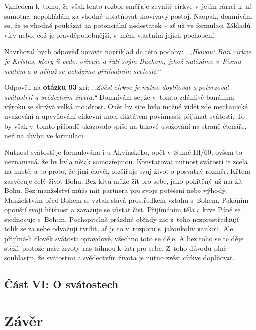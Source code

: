 Vzhledem k~tomu, že však tento rozbor směřuje zevnitř církve v~jejím rámci k~ní
samotné, nepokládám za vhodné uplatňovat shovívavý postoj. Naopak, domnívám se,
že je vhodné poukázat na potenciální nedostatek -- ať už ve formulaci Základů
víry nebo, což je pravděpodobnější, v~mém vlastním jejich pochopení.

Navrhoval bych odpověď upravit například do této podoby: \textit{,,,Hlavou` Boží
církve je Kristus, který ji vede, oživuje a řídí svým Duchem, jehož nalézáme
v~Písmu svatém a o něhož se ucházíme přijímáním svátostí.``}

Odpověď na \textbf{otázku 93} zní: \textit{,,Zvěst církve je nutno doplňovat a potvrzovat
svátostmi a svědectvím života.``} Domnívám se, že v~tomto zdánlivě banálním
výroku se skrývá velká moudrost. Opět by sice bylo možné vidět zde mechanické
uvažování a upevňování církevní moci diktátem povinnosti přijímat svátosti. To
by však v~tomto případě ukazovalo spíše na takové uvažování na straně čtenáře,
než na chybu ve formulaci.

Nutnost svátostí je formulována i u Akvinského, opět v~Sumě III/60, ovšem to
neznamená, že by byla nějak samozřejmou. Konstatovat nutnost svátostí je zcela
na místě, a to proto, že jimi člověk rozšiřuje svůj život o posvátný rozměr.
Křtem zasvěcuje celý život Bohu. Bez křtu může žít pro sebe, jako pokřtěný už má
žít Bohu. Bez manželství může mít partnera pro svoje potěšení nebo výhody.
Manželstvím před Bohem se vztah stává prostředkem vztahu s~Bohem. Pokáním
opouští svoji hříšnost a zavazuje se zůstat čist. Přijímáním těla a krve Páně se
sjednocuje s~Bohem. Pochopitelně prázdné obřady nic z~toho nezprostředkují --
tolik se za sebe odvažuji tvrdit, ať je to v~rozporu s~jakoukoliv naukou. Ale
přijímá-li člověk svátosti opravdově, všechno toto se děje. A bez toho se to
děje stěží, protože naše životy nás táhnou k~žití pro sebe. Z~toho důvodu plně
souhlasím, že svátostmi a svědectvím života je nutno zvěst církve doplňovat.

\section{Část VI: O svátostech}



\vspace{15mm}
\chapter{Závěr}
\label{div:zaver}

